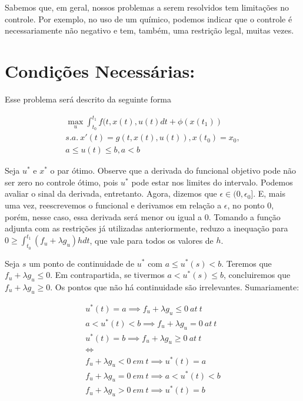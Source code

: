 Sabemos que, em geral, nossos problemas a serem resolvidos tem limitações no controle. Por exemplo, no uso de um químico, podemos indicar que o controle é necessariamente não negativo e tem, também, uma restrição legal, muitas vezes. 

\section{Condições Necessárias:} Esse problema será descrito da seguinte forma

\begin{align*}
    \max_u \int_{t_0}^{t_1} f(t,x(t),u(t)dt + \phi(x(t_1)) \\
    s.a.~x'(t) = g(t,x(t),u(t)), x(t_0) = x_0, \\
    a \leq u(t) \leq b, a < b
\end{align*}

Seja $u^*$ e $x^*$ o par ótimo. Observe que a derivada do funcional objetivo pode não ser zero no controle ótimo, pois $u^*$ pode estar nos limites do intervalo. Podemos avaliar o sinal da derivada, entretanto. Agora, dizemos que $\epsilon \in (0,\epsilon _0]$.  E, mais uma vez, reescrevemos o funcional e derivamos em relação a $\epsilon$, no ponto $0$, porém, nesse caso, essa derivada será menor ou igual a $0$. Tomando a função adjunta com as restrições já utilizadas anteriormente, reduzo a inequação para $0 \geq \int_{t_0}^{t_1} (f_u + \lambda g_u)h dt$, que vale para todos os valores de $h$. 

Seja $s$ um ponto de continuidade de $u^*$ com $a \leq u^*(s) < b$. Teremos que $f_u + \lambda g_u \leq 0$. Em contrapartida, se tivermos $a < u^*(s) \leq b$, concluiremos que $f_u + \lambda g_u \geq 0$. Os pontos que não há continuidade são irrelevantes. Sumariamente:

\begin{align*}
    u^*(t) = a \implies  f_u + \lambda g_u \leq 0 ~at~ t \\
    a < u^*(t) < b \implies f_u + \lambda g_u = 0 ~at~ t \\
    u^*(t) = b \implies f_u + \lambda g_u \geq 0 ~at~ t \\ 
    \iff \\
    f_u + \lambda g_u < 0 ~em~ t \implies u^*(t) = a \\
    f_u + \lambda g_u = 0 ~em~ t \implies a < u^*(t) < b \\
    f_u + \lambda g_u > 0 ~em~ t \implies u^*(t) = b \\
\end{align*}